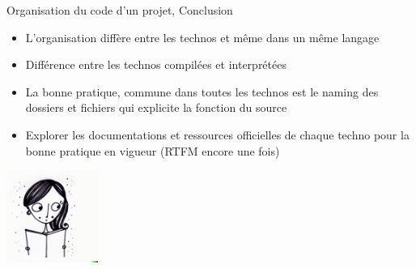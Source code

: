 \documentclass{beamer}
\begin{document}
    \begin{frame}{Organisation du code d'un projet, Conclusion}

        \begin{itemize}

            \item L'organisation diffère entre les technos et même dans un même langage
            \item Différence entre les technos compilées et interprétées
            \item La bonne pratique, commune dans toutes les technos est le naming des dossiers et fichiers qui explicite la fonction du source
            \item Explorer les documentations et ressources officielles de chaque techno pour la bonne pratique en vigueur (RTFM encore une fois)

        \end{itemize}

        \centering
        \includegraphics[width=3cm]{image/girl-reading-doc}

    \end{frame}
\end{document}
